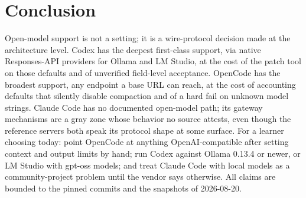 \documentclass{article}
\newcommand{\codex}[0]{Codex}
\newcommand{\occ}[0]{OpenCode}
\newcommand{\ccc}[0]{Claude Code}
\begin{document}
\section{Conclusion}

Open-model support is not a setting; it is a wire-protocol decision made
at the architecture level. \codex{} has the deepest first-class support,
via native Responses-API providers for Ollama and LM Studio, at the cost
of the patch tool on those defaults and of unverified field-level
acceptance. \occ{} has the broadest support, any endpoint a base URL can
reach, at the cost of accounting defaults that silently disable
compaction and of a hard fail on unknown model strings. \ccc{} has no
documented open-model path; its gateway mechanisms are a gray zone whose
behavior no source attests, even though the reference servers both speak
its protocol shape at some surface. For a learner choosing today: point \occ{} at anything
OpenAI-compatible after setting context and output limits by hand; run
\codex{} against Ollama 0.13.4 or newer, or LM Studio with gpt-oss
models; and treat \ccc{} with local models as a community-project
problem until the vendor says otherwise. All claims are bounded
to the pinned commits and the snapshots of 2026-08-20.



\end{document}
